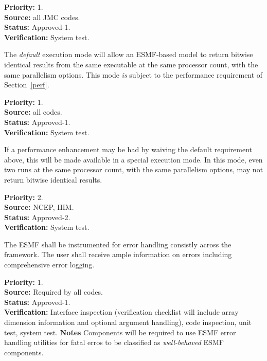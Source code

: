 \begin{reqlist}
{\bf Priority:} 1. \\
{\bf Source:} all JMC codes. \\
{\bf Status:} Approved-1. \\
{\bf Verification:} System test.
\end{reqlist}


The \emph{default} execution mode will allow an ESMF-based model to
return bitwise identical results from the same executable at the same
processor count, with the same parallelism options. This mode
\emph{is} subject to the performance requirement of
Section~\ref{perf}.

\begin{reqlist}
{\bf Priority:} 1. \\
{\bf Source:} all codes. \\
{\bf Status:} Approved-1. \\
{\bf Verification:} System test.
\end{reqlist}


If a performance enhancement may be had by waiving the default
requirement above, this will be made available in a special execution
mode. In this mode, even two runs at the same processor count, with
the same parallelism options, may not return bitwise identical
results.

\begin{reqlist}
{\bf Priority:} 2. \\
{\bf Source:} NCEP, HIM. \\
{\bf Status:} Approved-2. \\
{\bf Verification:} System test.
\end{reqlist}

The ESMF shall be instrumented for error handling consistly across the
framework.  The user shall receive ample information on errors including
comprehensive error logging.
\label{req:gr:error_handling}
\begin{reqlist}
  {\bf Priority:} 1. \\
  {\bf Source:} Required by all codes. \\
  {\bf Status:} Approved-1. \\
  {\bf Verification:} Interface inspection (verification
  checklist will include array dimension information and 
  optional argument handling), code inspection, unit
  test, system test.
  {\bf Notes} Components will be required to use ESMF error
handling utilities for fatal erros to be classified as 
{\it well-behaved} ESMF components.
\end{reqlist}

